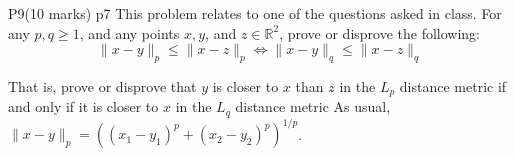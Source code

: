 \documentclass[a4paper, 11pt]{article}
\begin{document}
\begin{problem}{%
		P9\hfill  (10 marks)
	}{p7%
	}
This problem relates to one of the questions asked in class. For any $p, q \geq 1$, and any points $x, y$, and $z \in \mathbb{R}^2$, prove or disprove the following:
		$$
		\|x-y\|_p \leq\|x-z\|_p \Leftrightarrow\|x-y\|_q \leq\|x-z\|_q
		$$

	
	That is, prove or disprove that $y$ is closer to $x$ than $z$ in the $L_p$ distance metric if and only if it is closer to $x$ in the $L_q$ distance metric
	As usual, $\|x-y\|_p=\left(\left(x_1-y_1\right)^p+\left(x_2-y_2\right)^p\right)^{1 / p}$.
\end{problem}
\end{document}
